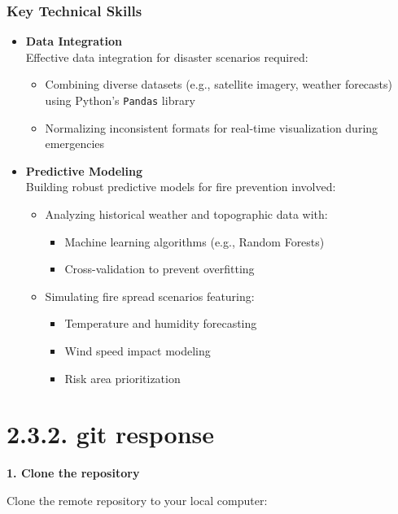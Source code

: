 \documentclass[a4paper, 11pt]{report}
\begin{document}
\subsubsection*{Key Technical Skills}
\begin{itemize}
    \item \textbf{Data Integration} \\
    Effective data integration for disaster scenarios required:
    \begin{itemize}
        \item Combining diverse datasets (e.g., satellite imagery, weather forecasts) using Python's \texttt{Pandas} library
        \item Normalizing inconsistent formats for real-time visualization during emergencies
    \end{itemize}

    \item \textbf{Predictive Modeling} \\
    Building robust predictive models for fire prevention involved:
    \begin{itemize}
        \item Analyzing historical weather and topographic data with:
        \begin{itemize}
            \item Machine learning algorithms (e.g., Random Forests)
            \item Cross-validation to prevent overfitting
        \end{itemize}
        \item Simulating fire spread scenarios featuring:
        \begin{itemize}
            \item Temperature and humidity forecasting
            \item Wind speed impact modeling
            \item Risk area prioritization
        \end{itemize}
    \end{itemize}
\end{itemize}
\newpage

\section*{2.3.2. git response}
\textbf{1. Clone the repository}

Clone the remote repository to your local computer:
\end{document}
